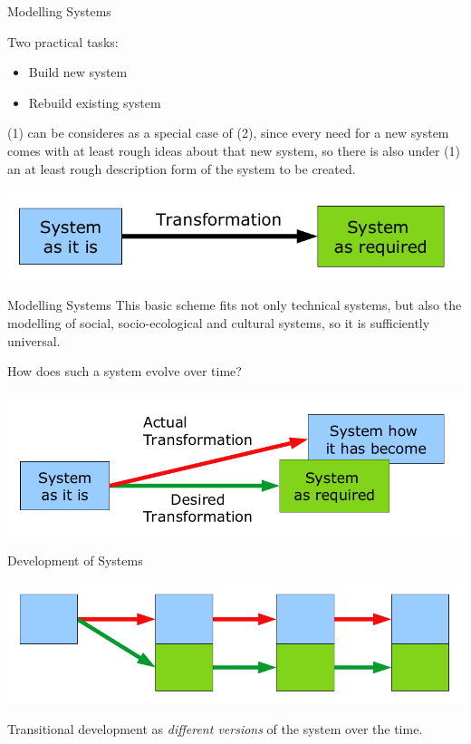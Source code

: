 \documentclass{beamer}
\begin{document}
\begin{frame}{Modelling Systems}

Two practical tasks:
\begin{itemize}
\item[(1)] Build new system
\item[(2)] Rebuild existing system
\end{itemize}

(1) can be consideres as a special case of (2), since every need for a new
system comes with at least rough ideas about that new system, so there is also
under (1) an at least rough description form of the system to be created.

\begin{center}
  \includegraphics[width=.9\textwidth]{Bilder/SD-1.png}
\end{center}
\end{frame}

\begin{frame}{Modelling Systems}
  This basic scheme fits not only technical systems, but also the modelling of
  social, socio-ecological and cultural systems, so it is sufficiently
  universal.

How does such a system evolve over time?
\begin{center}
  \includegraphics[width=.9\textwidth]{Bilder/SD-2.png}
\end{center}
\end{frame}

\begin{frame}{Development of Systems}
\begin{center}
  \includegraphics[width=.9\textwidth]{Bilder/SD-3.png}
\end{center}
Transitional development as \emph{different versions} of the system over the
time.
\end{frame}
\end{document}

